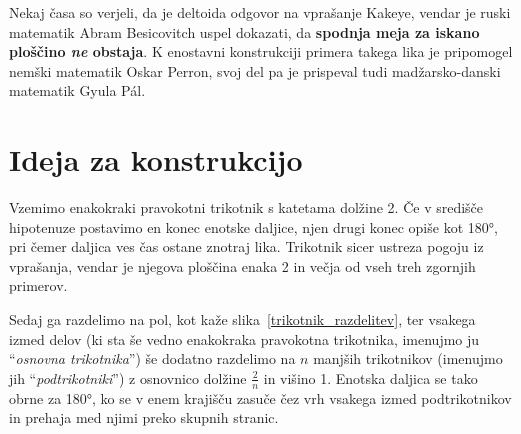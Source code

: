 \documentclass[a4paper, 12pt]{article}
\begin{document}
Nekaj časa so verjeli, da je deltoida odgovor na vprašanje Kakeye, vendar je ruski matematik Abram Besicovitch uspel dokazati, da \textbf{spodnja meja za iskano ploščino \emph{ne} obstaja}. K enostavni konstrukciji primera takega lika je pripomogel nemški matematik Oskar Perron, svoj del pa je prispeval tudi madžarsko-danski matematik Gyula Pál.


\section*{Ideja za konstrukcijo}

Vzemimo enakokraki pravokotni trikotnik s katetama dolžine 2. Če v središče hipotenuze postavimo en konec enotske daljice, njen drugi konec opiše kot 180°, pri čemer daljica ves čas ostane znotraj lika. Trikotnik sicer ustreza pogoju iz vprašanja, vendar je njegova ploščina enaka 2 in večja od vseh treh zgornjih primerov.

Sedaj ga razdelimo na pol, kot kaže slika~\ref{trikotnik_razdelitev}, ter vsakega izmed delov (ki sta še vedno enakokraka pravokotna trikotnika, imenujmo ju ``\emph{osnovna trikotnika}'') še dodatno razdelimo na $ n $ manjših trikotnikov (imenujmo jih ``\emph{podtrikotniki}'') z osnovnico dolžine $ \frac{2}{n} $ in višino 1. Enotska daljica se tako obrne za 180°, ko se v enem krajišču zasuče čez vrh vsakega izmed podtrikotnikov in prehaja med njimi preko skupnih stranic.
\end{document}
